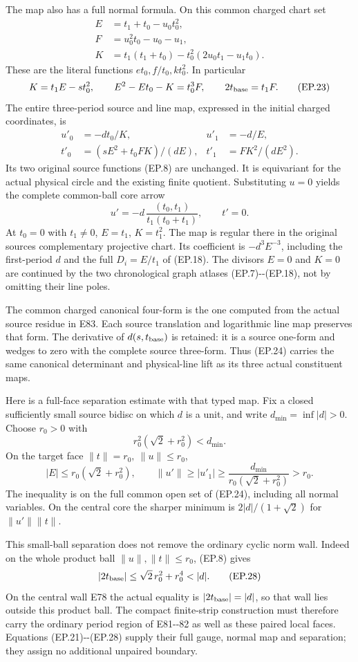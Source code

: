 The map also has a full normal formula. On this common charged
chart set
\[
 \begin{aligned}
 E&=t_1+t_0-u_0t_0^2,\\
 F&=u_0^2t_0-u_0-u_1,\\
 K&=t_1(t_1+t_0)-t_0^2(2u_0t_1-u_1t_0).
 \end{aligned}
 \tag{EP.22}
\]
These are the literal functions \(et_0,f/t_0,kt_0^2\).
In particular
\[
 K=t_1E-st_0^2,\qquad
 E^2-Et_0-K=t_0^3F,\qquad 2t_{\rm base}=t_1F .
 \tag{EP.23}
\]
The entire three-period source and line map, expressed in the
initial charged coordinates, is
\[
 \begin{aligned}
 u'_0&=-dt_0/K,&u'_1&=-d/E,\\
 t'_0&=(sE^2+t_0FK)/(dE),&
 t'_1&=FK^2/(dE^2).
 \end{aligned}
 \tag{EP.24}
\]
Its two original source functions (EP.8) are unchanged.
It is equivariant for the actual physical circle and the
existing finite quotient. Substituting \(u=0\) yields the
complete common-ball core arrow
\[
 u'=-d\,\frac{(t_0,t_1)}{t_1(t_0+t_1)},\qquad t'=0 .
 \tag{EP.25}
\]
At \(t_0=0\) with \(t_1\ne0\), \(E=t_1\), \(K=t_1^2\).
The map is regular there in the original source\textquotesingle s
complementary projective chart. Its coefficient is
\(-d^3 E^{-3}\), including the first-period \(d\) and the
full \(D_i=E/t_1\) of (EP.18).
The divisors \(E=0\) and \(K=0\) are continued by the two
chronological graph atlases (EP.7)-\/-(EP.18), not by omitting
their line poles.

The common charged canonical four-form is the one computed
from the actual source residue in E83. Each source translation
and logarithmic line map preserves that form. The derivative
of \(d(s,t_{\rm base})\) is retained: it is a source one-form
and wedges to zero with the complete source three-form.
Thus (EP.24) carries the same canonical determinant and
physical-line lift as its three actual constituent maps.

Here is a full-face separation estimate with that typed map.
Fix a closed sufficiently small source bidisc on which
\(d\) is a unit, and write \(d_{\min}=\inf|d|>0\).
Choose \(r_0>0\) with
\[
 r_0^2(\sqrt2+r_0^2)<d_{\min}.
 \tag{EP.26}
\]
On the target face \(\|t\|=r_0,\ \|u\|\le r_0\),
\[
 |E|\le r_0(\sqrt2+r_0^2),\qquad
 \|u'\|\ge |u'_1|
       \ge\frac{d_{\min}}{r_0(\sqrt2+r_0^2)}>r_0 .
 \tag{EP.27}
\]
The inequality is on the full common open set of (EP.24),
including all normal variables. On the central core the
sharper minimum is
\(2|d|/(1+\sqrt2)\) for \(\|u'\|\|t\|\).

This small-ball separation does not remove the ordinary
cyclic norm wall. Indeed on the whole product ball
\(\|u\|,\|t\|\le r_0\), (EP.8) gives
\[
 |2t_{\rm base}|\le \sqrt2\,r_0^2+r_0^4<|d|.
 \tag{EP.28}
\]
On the central wall E78 the actual equality is
\(|2t_{\rm base}|=|d|\), so that wall lies outside this
product ball. The compact finite-strip construction must
therefore carry the ordinary period region of E81-\/-82
as well as these paired local faces. Equations
(EP.21)-\/-(EP.28) supply their full gauge, normal map and
separation; they assign no additional unpaired boundary.

